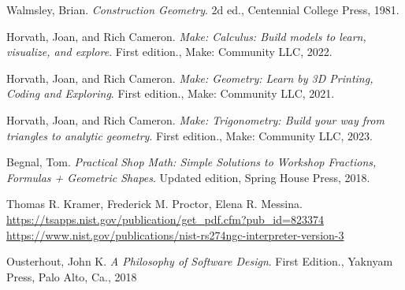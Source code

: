 \documentclass{ltxdoc}
\begin{document}
\begin{thebibliography}{Ousterhout2018APO}

Walmsley, Brian. \emph{Construction Geometry}. 2d ed., Centennial College Press, 1981.
 
Horvath, Joan, and Rich Cameron. 
\emph{Make: Calculus: Build models to learn, visualize, and explore}. First edition., 
Make: Community LLC, 2022.
 
Horvath, Joan, and Rich Cameron. 
\emph{Make: Geometry: Learn by 3D Printing, Coding and Exploring}. First edition., 
Make: Community LLC, 2021.

Horvath, Joan, and Rich Cameron. 
\emph{Make: Trigonometry: Build your way from triangles to analytic geometry}. First edition., 
Make: Community LLC, 2023.
 
Begnal, Tom. \emph{Practical Shop Math: Simple Solutions to Workshop Fractions, Formulas + Geometric Shapes}. Updated edition, Spring House Press, 2018.
 
Thomas R. Kramer, Frederick M. Proctor, Elena R. Messina.\\
\mbox{\url{https://tsapps.nist.gov/publication/get_pdf.cfm?pub_id=823374}}\\
\url{https://www.nist.gov/publications/nist-rs274ngc-interpreter-version-3}

Ousterhout, John K.
\emph{A Philosophy of Software Design}. First Edition., Yaknyam Press, Palo Alto, Ca., 2018



\end{thebibliography}

\createindexes

 
\end{document}
